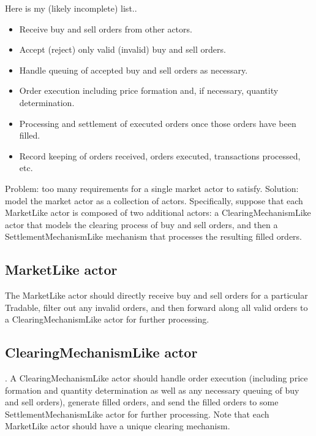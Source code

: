 \documentclass[a4paper]{article}
\begin{document}
Here is my (likely incomplete) list..
\begin{itemize}
    \item Receive buy and sell orders from other actors.
    \item Accept (reject) only valid (invalid) buy and sell orders.
    \item Handle queuing of accepted buy and sell orders as necessary.
    \item Order execution including price formation and, if necessary, quantity determination.
    \item Processing and settlement of executed orders once those orders have been filled.
    \item Record keeping of orders received, orders executed, transactions processed, etc.
\end{itemize}

Problem: too many requirements for a single market actor to satisfy. Solution: model the market actor as a collection of actors. Specifically, suppose that each MarketLike actor is composed of two additional actors: a ClearingMechanismLike actor that models the clearing process of buy and sell orders, and then a SettlementMechanismLike mechanism that processes the resulting filled orders.

\subsection{MarketLike actor} The MarketLike actor should directly receive buy and sell orders for a particular Tradable, filter out any invalid orders, and then forward along all valid orders to a ClearingMechanismLike actor for further processing.

\subsection{ClearingMechanismLike actor}. A ClearingMechanismLike actor should handle order execution (including price formation and quantity determination as well as any necessary queuing of buy and sell orders), generate filled orders, and send the filled orders to some SettlementMechanismLike actor for further processing. Note that each MarketLike actor should have a unique clearing mechanism.
\end{document}
